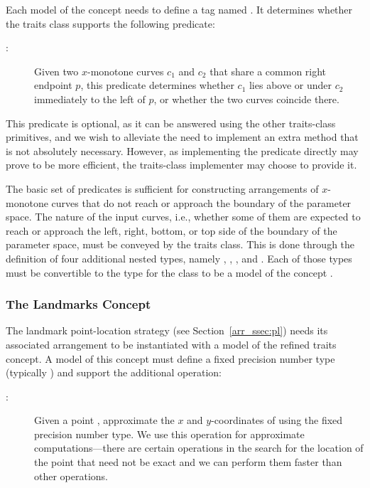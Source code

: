 Each model of the concept 
needs to define a tag named . It determines
whether the traits class supports the following predicate:
\begin{description}
\item[:]
  Given two $x$-monotone curves $c_1$ and $c_2$ that share a common
  right endpoint $p$, this predicate determines whether $c_1$ lies
  above or under $c_2$ immediately to the left of $p$, or whether the
  two curves coincide there.
\end{description}
This predicate is optional, as it can be answered using the
other traits-class primitives, and we wish to alleviate the
need to implement an extra method that is not absolutely
necessary. However, as implementing the predicate directly
may prove to be more efficient, the traits-class
implementer may choose to provide it.

The basic set of predicates is sufficient for constructing
arrangements of $x$-monotone curves that do not reach or approach the
boundary of the parameter space. The nature of the input curves, i.e.,
whether some of them are expected to reach or approach the left, right,
bottom, or top side of the boundary of the parameter space, must be
conveyed by the traits class. This is done through the definition of
four additional nested types, namely ,
, , and
. Each of those types must be convertible to
the type  for the class to be a model of
the concept .

\subsubsection{The Landmarks Concept
\label{arr_sssec:tr_lanmarks_concept}}

The landmark point-location strategy (see
Section~\ref{arr_ssec:pl}) needs its associated arrangement to be
instantiated with a model of the refined
 traits concept. A model of this
concept must define a fixed precision number type (typically
) and support the additional operation:
\begin{description}
\item[:]
  Given a point , approximate the $x$ and $y$-coordinates
  of  using the fixed precision number type. We use this
  operation for approximate computations---there are certain
  operations in the search for the location of the point that need not
  be exact and we can perform them faster than other operations.
%
\end{description}

